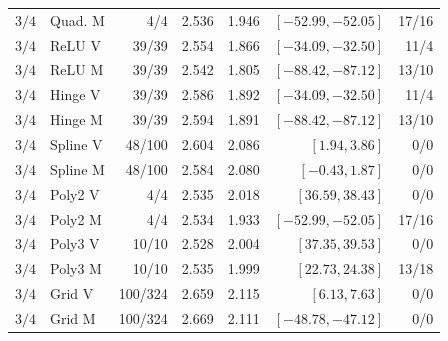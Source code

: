 \begin{longtable}{rlrrrrr}
$3/4$ & Quad. M & 4/4 & 2.536 & 1.946 & $[-52.99,-52.05]$ & 17/16\\
$3/4$ & ReLU V & 39/39 & 2.554 & 1.866 & $[-34.09,-32.50]$ & 11/4\\
$3/4$ & ReLU M & 39/39 & 2.542 & 1.805 & $[-88.42,-87.12]$ & 13/10\\
$3/4$ & Hinge V & 39/39 & 2.586 & 1.892 & $[-34.09,-32.50]$ & 11/4\\
$3/4$ & Hinge M & 39/39 & 2.594 & 1.891 & $[-88.42,-87.12]$ & 13/10\\
$3/4$ & Spline V & 48/100 & 2.604 & 2.086 & $[1.94,3.86]$ & 0/0\\
$3/4$ & Spline M & 48/100 & 2.584 & 2.080 & $[-0.43,1.87]$ & 0/0\\
$3/4$ & Poly2 V & 4/4 & 2.535 & 2.018 & $[36.59,38.43]$ & 0/0\\
$3/4$ & Poly2 M & 4/4 & 2.534 & 1.933 & $[-52.99,-52.05]$ & 17/16\\
$3/4$ & Poly3 V & 10/10 & 2.528 & 2.004 & $[37.35,39.53]$ & 0/0\\
$3/4$ & Poly3 M & 10/10 & 2.535 & 1.999 & $[22.73,24.38]$ & 13/18\\
$3/4$ & Grid V & 100/324 & 2.659 & 2.115 & $[6.13,7.63]$ & 0/0\\
$3/4$ & Grid M & 100/324 & 2.669 & 2.111 & $[-48.78,-47.12]$ & 0/0\\
\end{longtable}
\endgroup


